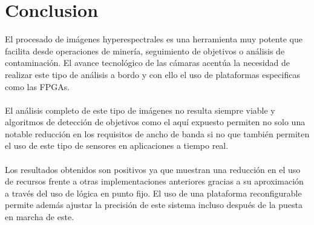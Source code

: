 \cleardoublepage
\chapter{Conclusion}
\label{makereference}
El procesado de imágenes hyperespectrales es una herramienta muy potente que facilita desde operaciones de minería, seguimiento de objetivos o análisis de contaminación. El avance tecnológico de las cámaras acentúa la necesidad de realizar este tipo de análisis a bordo y con ello el uso de plataformas especificas como las FPGAs.
\\
\\
El análisis completo de este tipo de imágenes no resulta siempre viable y algoritmos de detección de objetivos como el aquí expuesto permiten no solo una notable reducción en los requisitos de ancho de banda si no que también permiten el uso de este tipo de sensores en aplicaciones a tiempo real.
\\
\\
Los resultados obtenidos son positivos ya que muestran una reducción en el uso de recursos frente a otras implementaciones anteriores gracias a su aproximación a través del uso de lógica en punto fijo. El uso de una plataforma reconfigurable permite además ajustar la precisión de este sistema incluso después de la puesta en marcha de este.